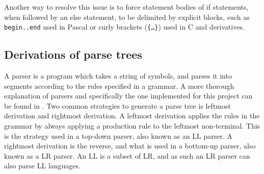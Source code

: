 Another way to resolve this issue is to force statement bodies of if statements, when followed by an else statement, to be delimited by explicit blocks, such as \texttt{begin..end} used in Pascal or curly brackets (\texttt{\{\ldots\}}) used in C and derivatives. 

\subsection{Derivations of parse trees}\label{sec:parsetrees}
A parser is a program which takes a string of symbols, and parses it into segments according to the rules specified in a grammar.
A more thorough explanation of parsers and specifically the one implemented for this project can be found in .
Two common strategies to generate a parse tree is leftmost derivation and rightmost derivation. 
A leftmost derivation applies the rules in the grammar by always applying a production rule to the leftmost non-terminal. 
This is the strategy used in a top-down parser, also known as an LL parser.
A rightmost derivation is the reverse, and what is used in a bottom-up parser, also known as a LR parser.
An LL is a subset of LR, and as such an LR parser can also parse LL languages. 

